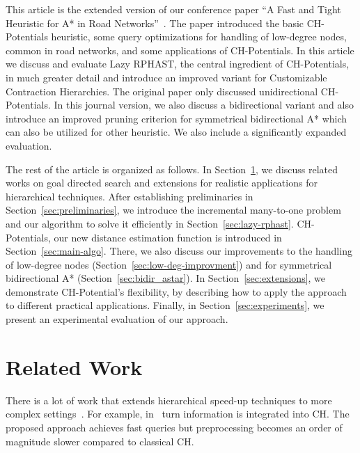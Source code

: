 \documentclass[manuscript,review]{acmart}
\begin{document}
This article is the extended version of our conference paper ``A Fast and Tight Heuristic for A* in Road Networks''~\cite{strasser_et_al:LIPIcs.SEA.2021.6}.
The paper introduced the basic CH-Potentials heuristic, some query optimizations for handling of low-degree nodes, common in road networks, and some applications of CH-Potentials.
In this article we discuss and evaluate Lazy RPHAST, the central ingredient of CH-Potentials, in much greater detail and introduce an improved variant for Customizable Contraction Hierarchies.
The original paper only discussed unidirectional CH-Potentials.
In this journal version, we also discuss a bidirectional variant and also introduce an improved pruning criterion for symmetrical bidirectional A* which can also be utilized for other heuristic.
We also include a significantly expanded evaluation.

The rest of the article is organized as follows.
In Section~\ref{sec:related_work}, we discuss related works on goal directed search and extensions for realistic applications for hierarchical techniques.
After establishing preliminaries in Section~\ref{sec:preliminaries}, we introduce the incremental many-to-one problem and our algorithm to solve it efficiently in Section~\ref{sec:lazy-rphast}.
CH-Potentials, our new distance estimation function is introduced in Section~\ref{sec:main-algo}.
There, we also discuss our improvements to the handling of low-degree nodes (Section~\ref{sec:low-deg-improvment}) and for symmetrical bidirectional A* (Section~\ref{sec:bidir_astar}).
In Section~\ref{sec:extensions}, we demonstrate CH-Potential's flexibility, by describing how to apply the approach to different practical applications.
Finally, in Section~\ref{sec:experiments}, we present an experimental evaluation of our approach.

\section{Related Work}\label{sec:related_work}

There is a lot of work that extends hierarchical speed-up techniques to more complex settings~\cite{bdgmpsww-rptn-16}.
For example, in~\cite{gv-errnt-11} turn information is integrated into CH.
The proposed approach achieves fast queries but preprocessing becomes an order of magnitude slower compared to classical CH.
\end{document}
